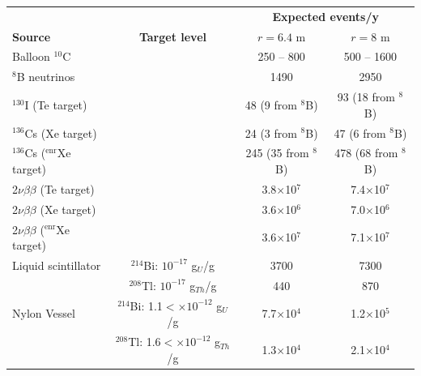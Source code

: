 \begin{table}[t]
\centering
\begin{tabular}{lccc}
\toprule
                                            &                                              & \multicolumn{2}{c}{\bf Expected events/y}     \\
{\bf Source}                                & {\bf Target level}                           & $r = 6.4$ m           & $r = 8$ m             \\
\midrule
Balloon $^{10}$C                            &                                              & 250 -- 800            & 500 -- 1600           \\
$^{8}$B neutrinos                           &                                              & 1490                  & 2950                  \\
$^{130}$I (Te target)                       &                                              & 48 (9 from $^{8}$B)   & 93  (18 from $^{8}$B) \\
$^{136}$Cs (Xe target)                      &                                              & 24 (3 from $^{8}$B)   & 47 (6 from $^{8}$B)   \\
$^{136}$Cs ($^\mathrm{enr}$Xe target)       &                                              & 245 (35 from $^{8}$B) & 478 (68 from $^{8}$B) \\
2$\nu\beta\beta$ (Te target)                &                                              & 3.8$\times$10$^{7}$   & 7.4$\times$10$^{7}$   \\  
2$\nu\beta\beta$ (Xe target)                &                                              & 3.6$\times$10$^{6}$   & 7.0$\times$10$^{6}$   \\  
2$\nu\beta\beta$ ($^\mathrm{enr}$Xe target) &                                              & 3.6$\times$10$^{7}$   &  7.1$\times$10$^{7}$  \\  
Liquid scintillator                         & $^{214}$Bi: $10^{-17}$ g$_{U}$/g             & 3700                  & 7300                  \\
                                            & $^{208}$Tl: $10^{-17}$ g$_{Th}$/g            & 440                   & 870                   \\
Nylon Vessel                                & $^{214}$Bi: 1.1$<\times10^{-12}$ g$_{U}$/g   & 7.7$\times$10$^{4}$   & 1.2$\times$10$^{5}$   \\
                                            & $^{208}$Tl: 1.6$<\times10^{-12}$ g$_{Th}$/g  & 1.3$\times$10$^{4}$   & 2.1$\times$10$^{4}$   \\

\end{tabular}
\end{table}
